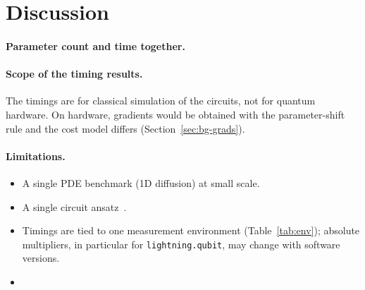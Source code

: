 \section{Discussion}
\label{sec:discussion}

\paragraph{Parameter count and time together.} 

\paragraph{Scope of the timing results.} The timings are for classical simulation of the circuits, not for
quantum hardware. On hardware, gradients would be obtained with the parameter-shift rule and the cost model
differs (Section~\ref{sec:bg-grads}).

\paragraph{Limitations.}
\begin{itemize}
  \item A single PDE benchmark (1D diffusion) at small scale.
  \item A single circuit ansatz~\cite{farea2025}.
  \item Timings are tied to one measurement environment (Table~\ref{tab:env}); absolute multipliers, in
  particular for \texttt{lightning.qubit}, may change with software versions.
  \item {}
\end{itemize}

